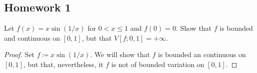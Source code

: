 \subsection{Homework 1}
\begin{problem}
Let $f(x)=x\sin(1/x)$ for $0<x\leq 1$ and $f(0)=0$. Show that $f$ is
bounded and continuous on $[0,1]$, but that $V[f;0,1]=+\infty$.
\end{problem}
\begin{proof}
Set $f\coloneqq x\sin(1/x)$. We will show that $f$ is bounded an continuous
on $[0,1]$, but that, nevertheless, it $f$ is not of bounded variation on
$[0,1]$.


\end{proof}

